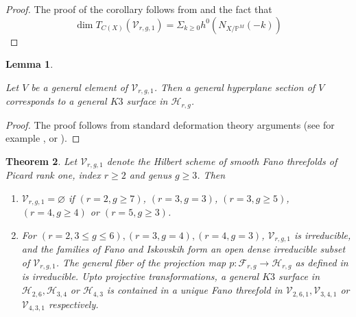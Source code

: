 \documentclass[11pt,twoside]{amsart}
\theoremstyle{plain}
\numberwithin{equation}{section}
\newtheorem{theorem}{Theorem}[section]
\newtheorem{lemma}[theorem]{Lemma}
\theoremstyle{definition}
\begin{document}
\begin{proof}
    The proof of the corollary follows from  and the fact that $$\operatorname{dim}T_{C(X)}(\mathcal{V}_{r,g,1}) = \Sigma_{k \geq 0} h^0(N_{X/\mathbb{P}^M}(-k))$$
\end{proof}

\begin{lemma}\label{hyperplane section of a general fano is a general K3}

Let $V$ be a general element of $\mathcal{V}_{r,g,1}$. Then a general hyperplane section of $V$ corresponds to a general $K3$ surface in $\mathcal{H}_{r,g}$.
    
\end{lemma}

\begin{proof}
    The proof follows from standard deformation theory arguments (see for example \cite[Lemma $3.7$]{CLM98}, or \cite{Bea02}).
\end{proof}

\begin{theorem}\label{classification of fanos with index two}
Let $\mathcal{V}_{r,g,1}$ denote the Hilbert scheme of smooth Fano threefolds of Picard rank one, index $r \geq 2$ and genus $g \geq 3$. Then 
\begin{enumerate}
    \item $\mathcal{V}_{r,g,1} = \varnothing$ if $(r = 2, g \geq 7)$, $(r = 3, g = 3)$, $(r = 3, g \geq 5)$, $(r = 4, g \geq 4)$ or $(r = 5, g \geq 3)$. 
    \item For $(r = 2, 3 \leq g \leq 6), (r = 3, g = 4), (r = 4, g = 3)$, $\mathcal{V}_{r,g,1}$ is irreducible, and the families of Fano and Iskovskih form an open dense irreducible subset of $\mathcal{V}_{r,g,1}$. The general fiber of the projection map $p: \mathcal{F}_{r,g} \to \mathcal{H}_{r,g}$ as defined in  is irreducible. Upto projective transformations, a general $K3$ surface in $\mathcal{H}_{2,6}, \mathcal{H}_{3,4}$ or $ \mathcal{H}_{4,3}$ is contained in a unique Fano threefold in $\mathcal{V}_{2,6,1}, \mathcal{V}_{3,4,1}$ or $ \mathcal{V}_{4,3,1}$ respectively.
\end{enumerate}
\end{theorem}
\end{document}
